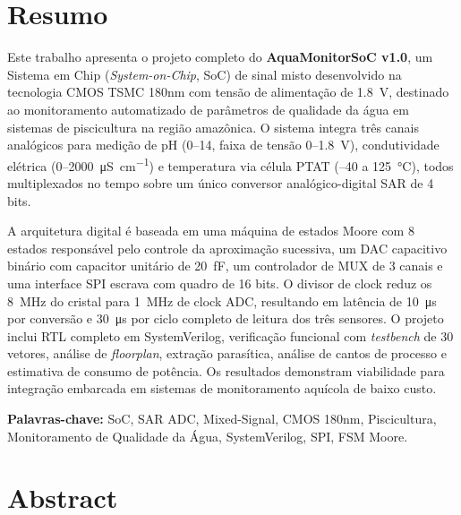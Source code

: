 \documentclass[12pt,a4paper]{article}
\begin{document}
\thispagestyle{empty}
\newpage
\tableofcontents
\newpage
\listoffigures
\newpage
\listoftables
\newpage

\section*{Resumo}

Este trabalho apresenta o projeto completo do \textbf{AquaMonitorSoC v1.0},
um Sistema em Chip (\textit{System-on-Chip}, SoC) de sinal misto desenvolvido
na tecnologia CMOS TSMC 180nm com tensão de alimentação de \SI{1.8}{\volt},
destinado ao monitoramento automatizado de parâmetros de qualidade da água
em sistemas de piscicultura na região amazônica. O sistema integra três canais
analógicos para medição de pH (0--14, faixa de tensão 0--\SI{1.8}{\volt}),
condutividade elétrica (0--\SI{2000}{\micro\siemens\per\centi\meter}) e
temperatura via célula PTAT (--40 a \SI{125}{\celsius}), todos multiplexados
no tempo sobre um único conversor analógico-digital SAR de 4 bits.

A arquitetura digital é baseada em uma máquina de estados Moore com 8 estados
responsável pelo controle da aproximação sucessiva, um DAC capacitivo binário com
capacitor unitário de \SI{20}{\femto\farad}, um controlador de MUX de 3 canais e
uma interface SPI escrava com quadro de 16 bits. O divisor de clock reduz os
\SI{8}{\mega\hertz} do cristal para \SI{1}{\mega\hertz} de clock ADC, resultando
em latência de \SI{10}{\micro\second} por conversão e \SI{30}{\micro\second}
por ciclo completo de leitura dos três sensores. O projeto inclui RTL completo
em SystemVerilog, verificação funcional com \textit{testbench} de 30 vetores,
análise de \textit{floorplan}, extração parasítica, análise de cantos de processo
e estimativa de consumo de potência. Os resultados demonstram viabilidade para
integração embarcada em sistemas de monitoramento aquícola de baixo custo.

\textbf{Palavras-chave:} SoC, SAR ADC, Mixed-Signal, CMOS 180nm, Piscicultura,
Monitoramento de Qualidade da Água, SystemVerilog, SPI, FSM Moore.

\newpage

\section*{Abstract}
\end{document}

